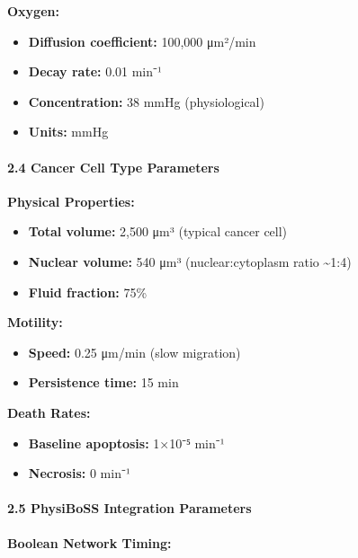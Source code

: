 \textbf{Oxygen:}

\begin{itemize}
\tightlist
\item
  \textbf{Diffusion coefficient:} 100,000 μm²/min
\item
  \textbf{Decay rate:} 0.01 min⁻¹
\item
  \textbf{Concentration:} 38 mmHg (physiological)
\item
  \textbf{Units:} mmHg
\end{itemize}

\hypertarget{cancer-cell-type-parameters}{%
\paragraph{2.4 Cancer Cell Type
Parameters}\label{cancer-cell-type-parameters}}

\textbf{Physical Properties:}

\begin{itemize}
\tightlist
\item
  \textbf{Total volume:} 2,500 μm³ (typical cancer cell)
\item
  \textbf{Nuclear volume:} 540 μm³ (nuclear:cytoplasm ratio
  \textasciitilde1:4)
\item
  \textbf{Fluid fraction:} 75\%
\end{itemize}

\textbf{Motility:}

\begin{itemize}
\tightlist
\item
  \textbf{Speed:} 0.25 μm/min (slow migration)
\item
  \textbf{Persistence time:} 15 min
\end{itemize}

\textbf{Death Rates:}

\begin{itemize}
\tightlist
\item
  \textbf{Baseline apoptosis:} 1×10⁻⁵ min⁻¹
\item
  \textbf{Necrosis:} 0 min⁻¹
\end{itemize}

\hypertarget{physiboss-integration-parameters}{%
\paragraph{2.5 PhysiBoSS Integration
Parameters}\label{physiboss-integration-parameters}}

\textbf{Boolean Network Timing:}

